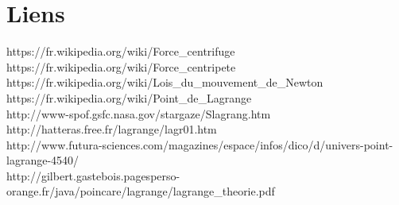 \documentclass[12pt]{article}
\begin{document}
\section*{Liens}
https://fr.wikipedia.org/wiki/Force\_centrifuge \\
https://fr.wikipedia.org/wiki/Force\_centripete \\
https://fr.wikipedia.org/wiki/Lois\_du\_mouvement\_de\_Newton \\
https://fr.wikipedia.org/wiki/Point\_de\_Lagrange \\
http://www-spof.gsfc.nasa.gov/stargaze/Slagrang.htm \\
http://hatteras.free.fr/lagrange/lagr01.htm \\
http://www.futura-sciences.com/magazines/espace/infos/dico/d/univers-point-lagrange-4540/ \\
http://gilbert.gastebois.pagesperso-orange.fr/java/poincare/lagrange/lagrange\_theorie.pdf 
\end{document}

